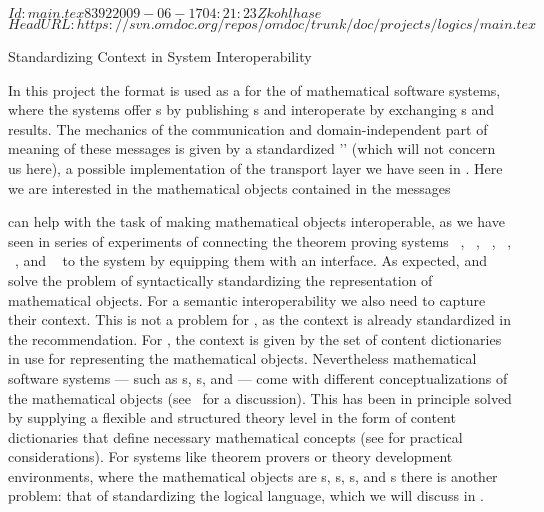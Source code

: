 \svnInfo $Id: main.tex 8392 2009-06-17 04:21:23Z kohlhase $
\svnKeyword $HeadURL: https://svn.omdoc.org/repos/omdoc/trunk/doc/projects/logics/main.tex $

\begin{omgroup}[id=logics,creators=miko]{Standardizing Context in System Interoperability}

  In this project the {\omdoc} format is used as a {} for the
  {} of mathematical software systems, where the
  systems offer {s} by publishing
  {s} and interoperate by exchanging
  {s} and results. The mechanics of the communication and
  domain-independent part of meaning of these messages is given by a standardized
  '{}' (which will not concern us here), a possible implementation
  of the transport layer we have seen in {}. Here we are interested in
  the mathematical objects contained in the messages

{\omdoc} can help with the task of making mathematical objects interoperable, as we have
seen in series of experiments of connecting the theorem proving systems
{\OMEGA}~\cite{BenzmuellerEtAl:otama97}, {\inka}~\cite{HuSe:itng96}, {\pvs}~\cite{OwRu92},
{\lambdaclam}~\cite{RicSmaGre:ppihol98}, {\tps}~\cite{AnBi:tatps96}, and
{\coq}~\cite{CoqManual} to the {\mbase} system by equipping them with an {\omdoc}
interface. As expected, {\openmath} and {\cmathml} solve the problem of syntactically
standardizing the representation of mathematical objects. For a semantic interoperability
we also need to capture their context. This is not a problem for {\cmathml}, as the
context is already standardized in the {\mathml} recommendation. For {\openmath}, the
context is given by the set of content dictionaries in use for representing the
mathematical objects. Nevertheless mathematical software systems --- such as
{s}, {s}, and
{} --- come with different conceptualizations of the
mathematical objects (see~\cite{KohKoh:esmk05} for a discussion). This has been in
principle solved by supplying a flexible and structured theory level in the form of
{\omdoc} content dictionaries that define necessary mathematical concepts (see
{} for practical considerations). For systems like
theorem provers or theory development environments, where the mathematical objects are
{s}, {s}, {s}, and
{s} there is another problem: that of standardizing the logical language,
which we will discuss in {}.


\end{omgroup}

